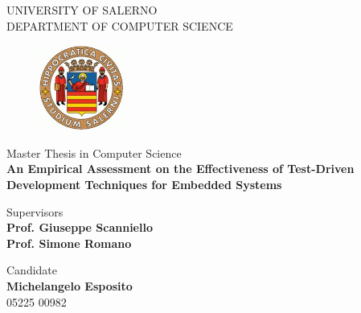 \renewcommand{\baselinestretch}{1.5}  
\begin{titlepage}  
    \begin{center}
        \LARGE{\uppercase{University of Salerno}}\\
        \vspace{5mm}
    	\uppercase{\normalsize Department of Computer Science}\\
    \end{center}

    \begin{figure}
        \centering
        \includegraphics[width=0.25\textwidth]{figures/logo_standard.jpg}
    \end{figure}
    
    \begin{center}
    	\large{ Master Thesis in Computer Science }\\
    	\vspace{5mm}
        {\LARGE{\textbf{An Empirical Assessment on the Effectiveness of Test-Driven Development Techniques for Embedded Systems}}}
    	\vspace{3mm}
    \end{center}
    
    \vspace{10mm}
    \noindent
    \begin{minipage}[t]{0.60\textwidth}
    	{\large{Supervisors}}
    	\\
    	{\large{\textbf{Prof. Giuseppe Scanniello}}}
        \\
        {\large{ \textbf{Prof. Simone Romano}}}
    \end{minipage}
    \hfill
    \begin{minipage}[t]{0.4\textwidth}\raggedleft
    
    	{\large{Candidate \\ \textbf{Michelangelo Esposito}\\ 05225 00982}}
    \end{minipage}
    
    \vspace{25mm}
    

\end{titlepage}

\renewcommand{\baselinestretch}{1} 